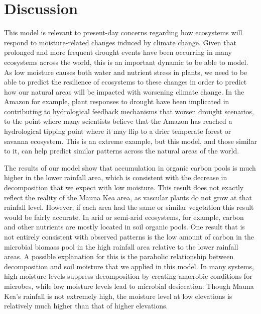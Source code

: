 \documentclass[12pt, letterpaper]{article}
\begin{document}
\section{Discussion}
This model is relevant to present-day concerns regarding how ecosystems will respond to moisture-related changes induced by climate change. Given that prolonged and more frequent drought events have been occurring in many ecosystems across the world, this is an important dynamic to be able to model. \cite{oconnell_drought_2018,staal_hysteresis_2020} As low moisture causes both water and nutrient stress in plants, we need to be able to predict the resilience of ecosystems to these changes in order to predict how our natural areas will be impacted with worsening climate change. \cite{cusack_seasonal_2019} In the Amazon for example, plant responses to drought have been implicated in contributing to hydrological feedback mechanisms that worsen drought scenarios, to the point where many scientists believe that the Amazon has reached a hydrological tipping point where it may flip to a drier temperate forest or savanna ecosystem. \cite{oconnell_drought_2018,staal_hysteresis_2020} This is an extreme example, but this model, and those similar to it, can help predict similar patterns across the natural areas of the world.

The results of our model show that accumulation in organic carbon pools is much higher in the lower rainfall area, which is consistent with the decrease in decomposition that we expect with low moisture. This result does not exactly reflect the reality of the Mauna Kea area, as vascular plants do not grow at that rainfall level. \cite{bateman_quantitative_2019} However, if each area had the same or similar vegetation this result would be fairly accurate. In arid or semi-arid ecosystems, for example, carbon and other nutrients are mostly located in soil organic pools. \cite{cairney_ericoid_2003} One result that is not entirely consistent with observed patterns is the low amount of carbon in the microbial biomass pool in the high rainfall area relative to the lower rainfall areas. A possible explanation for this is the parabolic relationship between decomposition and soil moisture that we applied in this model. \cite{cusack_seasonal_2019,porporato_hydrologic_2003} In many systems, high moisture levels suppress decomposition by creating anaerobic conditions for microbes, while low moisture levels lead to microbial desiccation. \cite{schimel_life_2018} Though Mauna Kea’s rainfall is not extremely high, the moisture level at low elevations is relatively much higher than that of higher elevations.
\end{document}
